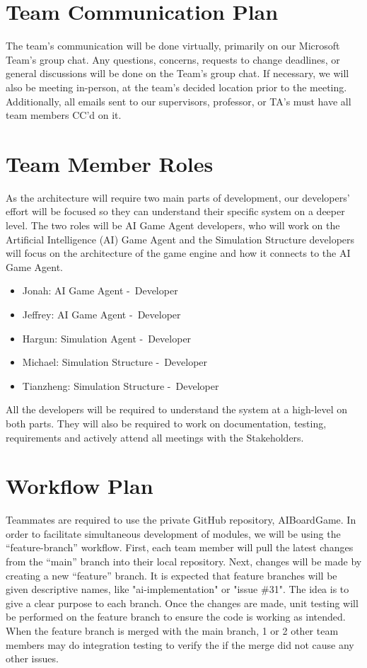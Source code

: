 \documentclass{article}
\begin{document}
\section{Team Communication Plan}
The team’s communication will be done virtually, primarily on our Microsoft Team’s group chat. Any questions, concerns, requests to change deadlines, or general discussions will be done on the Team’s group chat. If necessary, we will also be meeting in-person, at the team’s decided location prior to the meeting. 
Additionally, all emails sent to our supervisors, professor, or TA’s must have all team members CC’d on it.
\section{Team Member Roles}
As the architecture will require two main parts of development, our developers' effort will be focused so they can understand their specific system on a deeper level.
The two roles will be AI Game Agent developers, who will work on the Artificial Intelligence (AI) Game Agent and the Simulation Structure developers will focus on the architecture of the game engine and how it connects to the AI Game Agent.
\begin{itemize}
	\item Jonah: AI Game Agent -\ Developer
	\item Jeffrey: AI Game Agent -\ Developer
	\item Hargun: Simulation Agent -\ Developer
	\item Michael: Simulation Structure -\ Developer
	\item Tianzheng: Simulation Structure -\ Developer
\end{itemize}
All the developers will be required to understand the system at a high-level on both parts. They will also be required to work on documentation, testing, requirements and actively attend all meetings with the Stakeholders.
\section{Workflow Plan}
Teammates are required to use the private GitHub repository, AIBoardGame. 
In order to facilitate simultaneous development of modules, we will be using the “feature-branch” workflow. First, each team member will pull the latest changes from the “main” branch into their local repository. 
Next, changes will be made by creating a new “feature” branch. It is expected that feature branches will be given descriptive names, like "ai-implementation" or "issue \#31". The idea is to give a clear purpose to each branch. 
Once the changes are made, unit testing will be performed on the feature branch to ensure the code is working as intended. 
When the feature branch is merged with the main branch, 1 or 2 other team members may do integration testing to verify the if the merge did not cause any other issues. 
\end{document}
